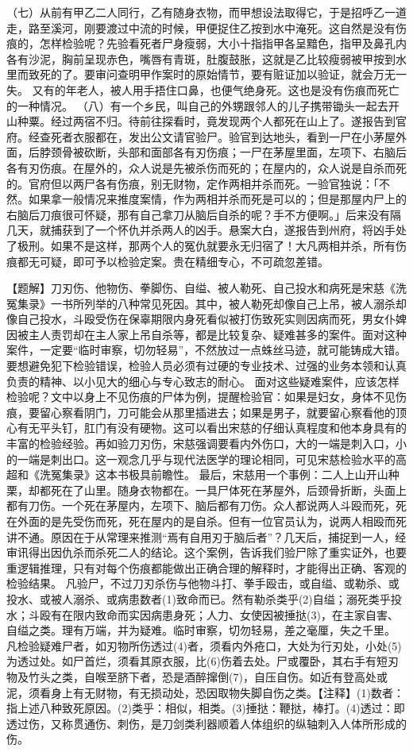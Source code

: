 \documentclass[12pt,UTF8]{ctexbook}
\begin{document}
（七）从前有甲乙二人同行，乙有随身衣物，而甲想设法取得它，于是招呼乙一道走，路至溪河，刚要渡过中流的时候，甲便捉住乙按到水中淹死。这自然是没有伤痕的，怎样检验呢？先验看死者尸身瘦弱，大小十指指甲各呈黯色，指甲及鼻孔内各有沙泥，胸前呈现赤色，嘴唇有青斑，肚腹鼓胀，这就是乙比较瘦弱被甲按到水里而致死的了。要审问查明甲作案时的原始情节，要有赃证加以验证，就会万无一失。
又有的年老人，被人用手捂住口鼻，也便气绝身死。这也是没有伤痕而死亡的一种情况。
（八）有一个乡民，叫自己的外甥跟邻人的儿子携带锄头一起去开山种粟。经过两宿不归。待前往探看时，竟发现两个人都死在山上了。遂报告到官府。经查死者衣服都在，发出公文请官验尸。验官到达地头，看到一尸在小茅屋外面，后脖颈骨被砍断，头部和面部各有刃伤痕；一尸在茅屋里面，左项下、右脑后各有刃伤痕。在屋外的，众人说是先被杀伤而死的；在屋内的，众人说是自杀而死的。官府但以两尸各有伤痕，别无财物，定作两相并杀而死。一验官独说：「不然。如果拿一般情况来推度案情，作为两相并杀而死是可以的；但是那屋内尸上的右脑后刀痕很可怀疑，那有自己拿刀从脑后自杀的呢？手不方便啊。」后来没有隔几天，就捕获到了一个怀仇并杀两人的凶手。悬案大白，遂报告到州府，将凶手处了极刑。如果不是这样，那两个人的冤仇就要永无归宿了！大凡两相并杀，所有伤痕都无可疑，即可予以检验定案。贵在精细专心，不可疏忽差错。

【题解】刀刃伤、他物伤、拳脚伤、自缢、被人勒死、自己投水和病死是宋慈《洗冤集录》一书所列举的八种常见死因。其中，被人勒死却像自己上吊，被人溺杀却像自己投水，斗殴受伤在保辜期限内身死看似被打伤致死实则因病而死，男女仆婢因被主人责罚却在主人家上吊自杀等，都是比较复杂、疑难甚多的案件。面对这种案件，一定要“临时审察，切勿轻易”，不然放过一点蛛丝马迹，就可能铸成大错。要想避免犯下检验错误，检验人员必须有过硬的专业技术、过强的业务本领和认真负责的精神、以小见大的细心与专心致志的耐心。
面对这些疑难案件，应该怎样检验呢？文中以身上不见伤痕的尸体为例，提醒检验官：如果是妇女，身体不见伤痕，要留心察看阴门，刀可能会从那里插进去；如果是男子，就要留心察看他的顶心有无平头钉，肛门有没有硬物。这可以看出宋慈的仔细认真程度和他本身具有的丰富的检验经验。再如验刀刃伤，宋慈强调要看内外伤口，大的一端是刺入口，小的一端是刺出口。这一观念几乎与现代法医学的理论相同，可见宋慈检验水平的高超和《洗冤集录》这本书极具前瞻性。
最后，宋慈用一个事例：二人上山开山种栗，却都死在了山里。随身衣物都在。一具尸体死在茅屋外，后颈骨折断，头面上都有刀伤。一个死在茅屋内，左项下、脑后都有刀伤。众人都说两人斗殴而死，死在外面的是先受伤而死，死在屋内的是自杀。但有一位官员认为，说两人相殴而死讲不通。原因在于从常理来推测“焉有自用刃于脑后者”？几天后，捕捉到一人，经审讯得出因仇杀而杀死二人的结论。这个案例，告诉我们验尸除了重实证外，也要重逻辑推理，只有对每个伤痕都能做出正确合理的解释时，才能得出正确、客观的检验结果。
凡验尸，不过刀刃杀伤与他物斗打、拳手殴击，或自缢、或勒杀、或投水、或被人溺杀、或病患数者(1)致命而已。然有勒杀类乎(2)自缢；溺死类乎投水；斗殴有在限内致命而实因病患身死；人力、女使因被捶挞(3)，在主家自害、自缢之类。理有万端，并为疑难。临时审察，切勿轻易，差之毫厘，失之千里。
凡检验疑难尸者，如刃物所伤透过(4)者，须看内外疮口，大处为行刃处，小处(5)为透过处。如尸首烂，须看其原衣服，比(6)伤着去处。尸或覆卧，其右手有短刃物及竹头之类，自喉至脐下者，恐是酒醉撺倒(7)，自压自伤。如近有登高处或泥，须看身上有无财物，有无损动处，恐因取物失脚自伤之类。【注释】(1)数者：指上述八种致死原因。(2)类乎：相似，相类。(3)捶挞：鞭挞，棒打。(4)透过：即透过伤，又称贯通伤、刺伤，是刀剑类利器顺着人体组织的纵轴刺入人体所形成的伤。
\end{document}
